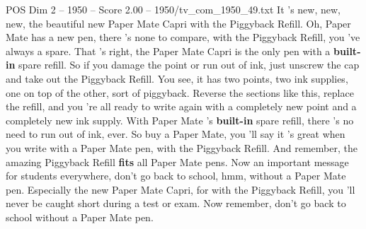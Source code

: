\begin{textsample}{POS Dim 2 – 1950 – Score 2.00 – 1950/tv\_com\_1950\_49.txt}  \label{ex:f2_pos_017}
It 's new, new, new, the beautiful new Paper Mate Capri with the Piggyback Refill.
Oh, Paper Mate has a new pen, there 's none to compare, with the Piggyback Refill, you 've always a spare.
That 's right, the Paper Mate Capri is the only pen with a \textbf{built-in} spare refill.
So if you damage the point or run out of ink, just unscrew the cap and take out the Piggyback Refill.
You see, it has two points, two ink supplies, one on top of the other, sort of piggyback.
Reverse the sections like this, replace the refill, and you 're all ready to write again with a completely new point and a completely new ink supply.
With Paper Mate 's \textbf{built-in} spare refill, there 's no need to run out of ink, ever.
So buy a Paper Mate, you 'll say it 's great when you write with a Paper Mate pen, with the Piggyback Refill.
And remember, the amazing Piggyback Refill \textbf{fits} all Paper Mate pens.
Now an important message for students everywhere, don't go back to school, hmm, without a Paper Mate pen.
Especially the new Paper Mate Capri, for with the Piggyback Refill, you 'll never be caught short during a test or exam.
Now remember, don't go back to school without a Paper Mate pen.

\end{textsample}
